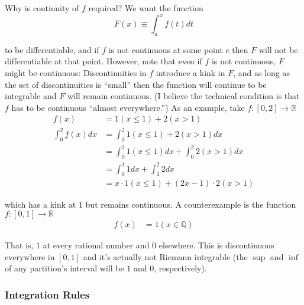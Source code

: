 \documentclass{article}
\begin{document}
\begin{remark}
  Why is continuity of $f$ required? We want the function
  \[
    F(x) \equiv \displaystyle\int_a^x f(t) dt
  \]

  to be differentiable, and if $f$ is not continuous at some point $c$ then $F$ will not be differentiable at that point. However, note that even if $f$ is not continuous, $F$ might be continuous: Discontinuities in $f$ introduce a kink in $F$, and as long as the set of discontinuities is ``small'' then the function will continue to be integrable and $F$ will remain continuous. (I believe the technical condition is that $f$ has to be continuous ``almost everywhere.'') As an example, take $f: [0, 2] \to \mathbb{R}$
  \begin{align*}
    f(x) & = 1(x \le 1) + 2(x > 1)
    \\
    \int_{0}^{2} f(x) dx
    & =
    \int_{0}^{2} 1(x \le 1) + 2(x > 1) dx
    \\
    & =
    \int_{0}^{2} 1(x \le 1) dx
    +
    \int_{0}^{2} 2(x > 1) dx
    \\
    & =
    \int_{0}^{1} 1 dx
    +
    \int_{1}^{2} 2 dx
    \\
    & =
    x \cdot 1(x \le 1)
    +
    (2x - 1) \cdot 2(x > 1)
  \end{align*}

  which has a kink at $1$ but remains continuous. A counterexample is the function $f: [0, 1] \to \mathbb{R}$
  \begin{align*}
    f(x) & = 1(x \in \mathbb{Q})
  \end{align*}

  That is, $1$ at every rational number and $0$ elsewhere. This is discontinuous everywhere in $[0, 1]$ and it's actually not Riemann integrable (the $\sup$ and $\inf$ of any partition's interval will be $1$ and $0$, respectively).
\end{remark}

\subsubsection{Integration Rules}
\label{ssub:integration_rules}
\end{document}
